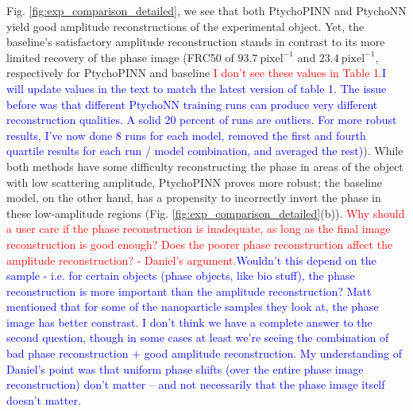 \documentclass[sn-mathphys]{sn-jnl}%
\theoremstyle{thmstyleone}%
\theoremstyle{thmstyletwo}%
\theoremstyle{thmstylethree}%
\begin{document}
Fig. \ref{fig:exp_comparison_detailed}, we see that both PtychoPINN and PtychoNN yield good amplitude reconstructions of the experimental object. Yet, the baseline's satisfactory amplitude reconstruction stands in contrast to its more limited recovery of the phase image (FRC50 of $93.7~\mathrm{pixel}^{-1}$ and $23.4~\mathrm{pixel}^{-1}$, respectively for PtychoPINN and baseline \textcolor{red}{I don't see these values in Table 1.}\textcolor{blue}{I will update values in the text to match the latest version of table 1. The issue before was that different PtychoNN training runs can produce very different reconstruction qualities. A solid 20 percent of runs are outliers. For more robust results, I've now done 8 runs for each model, removed the first and fourth quartile results for each run / model combination, and averaged the rest)}). While both methods have some difficulty reconstructing the phase in areas of the object with low scattering amplitude, PtychoPINN proves more robust; the baseline model, on the other hand, has a propensity to incorrectly invert the phase in these low-amplitude regions (Fig. \ref{fig:exp_comparison_detailed}(b)). \textcolor{red}{Why should a user care if the phase reconstruction is inadequate, as long as the final image reconstruction is good enough?  Does the poorer phase reconstruction affect the amplitude reconstruction? - Daniel's argument.}\textcolor{blue}{Wouldn't this depend on the sample - i.e. for certain objects (phase objects, like bio stuff), the phase reconstruction is more important than the amplitude reconstruction? Matt mentioned that for some of the nanoparticle samples they look at, the phase image has better constrast. I don't think we have a complete answer to the second question, though in some cases at least we're seeing the combination of bad phase reconstruction + good amplitude reconstruction. My understanding of Daniel's point was that uniform phase shifts (over the entire phase image reconstruction) don't matter -- and not necessarily that the phase image itself doesn't matter. }


\end{document}

